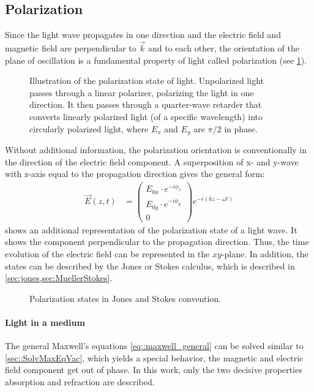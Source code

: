 \subsection{Polarization}\label{sec:polarization}
%
Since the light wave propagates in one direction and the electric field and magnetic field are perpendicular to $\vec{k}$ and to each other, the orientation of the plane of oscillation is a fundamental property of light called polarization (see \cref{fig:polarization_state}).
%
\begin{figure}[!t]
\centering
\setlength{\tikzwidth}{\textwidth}
\caption[]{Illustration of the polarization state of light. Unpolarized light passes through a linear polarizer, polarizing the light in one direction. It then passes through a quarter-wave retarder that converts linearly polarized light (of a specific wavelength) into circularly polarized light, where $E_x$ and $E_y$ are $\pi/2$ in phase.}
\label{fig:polarization_state}
\end{figure}
%
Without additional information, the polarization orientation is conventionally in the direction of the electric field component.
A superposition of x- and y-wave with z-axis equal to the propagation direction gives the general form:
%
\begin{align}
    \vec{E}(z,t) &= \begin{pmatrix} E_{0x} \cdot e^{ -i \phi_x } \\ E_{0y} \cdot e^{ -i \phi_y } \\ 0 \end{pmatrix}
e^{ -i (kz - \omega t)}
\end{align}
%
 shows an additional representation of the polarization state of a light wave.
It shows the component perpendicular to the propagation direction.
Thus, the time evolution of the electric field can be represented in the $xy$-plane.
In addition, the states can be described by the Jones or Stokes calculus, which is described in \cref{sec:jones,sec:MuellerStokes}.
%
\begin{figure}[!t]
\centering

\caption[]{Polarization states in Jones and Stokes convention.}
\label{fig:polarization_state_vectors}
\end{figure}
%
%
%
\paragraph*{Light in a medium}
%
The general Maxwell's equations \cref{eq::maxwell_general} can be solved similar to \cref{sec::SolvMaxEqVac}, which yields a special behavior, \eg{} the magnetic and electric field component get out of phase.
In this work, only the two decisive properties absorption and refraction are described.
%
%
%
